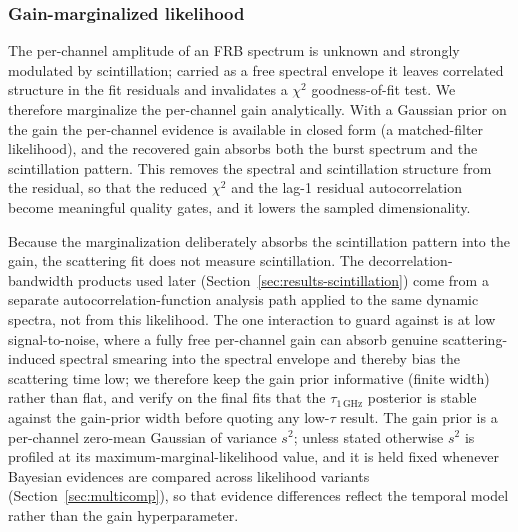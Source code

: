 
\subsubsection{Gain-marginalized likelihood}
\label{sec:gainmarg}
\label{sec:beta-gainmarg}

The per-channel amplitude of an FRB spectrum is unknown and strongly modulated
by scintillation; carried as a free spectral envelope it leaves correlated
structure in the fit residuals and invalidates a $\chi^2$ goodness-of-fit test.
We therefore marginalize the per-channel gain analytically. With a Gaussian
prior on the gain the per-channel evidence is available in closed form (a
matched-filter likelihood), and the recovered gain absorbs both the burst
spectrum and the scintillation pattern. This removes the spectral and
scintillation structure from the residual, so that the reduced $\chi^2$ and the
lag-1 residual autocorrelation become meaningful quality gates, and it lowers
the sampled dimensionality.

Because the marginalization deliberately absorbs the scintillation pattern into
the gain, the scattering fit does not measure scintillation. The
decorrelation-bandwidth products used later
(Section~\ref{sec:results-scintillation}) come from a separate
autocorrelation-function analysis path applied to the same dynamic spectra, not
from this likelihood. The one interaction to guard against is at low
signal-to-noise, where a fully free per-channel gain can absorb genuine
scattering-induced spectral smearing into the spectral envelope and thereby bias
the scattering time low; we therefore keep the gain prior informative (finite
width) rather than flat, and verify on the final fits that the
$\tau_{1\,\mathrm{GHz}}$ posterior is stable against the gain-prior width before
quoting any low-$\tau$ result. The gain prior is a per-channel zero-mean
Gaussian of variance $s^2$; unless stated otherwise $s^2$ is profiled at its
maximum-marginal-likelihood value, and it is held fixed whenever Bayesian
evidences are compared across likelihood variants
(Section~\ref{sec:multicomp}), so that evidence differences reflect the
temporal model rather than the gain hyperparameter.

